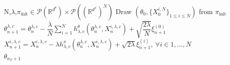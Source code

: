\documentclass[a4paper, 10pt]{article}
\theoremstyle{plain}%
\begin{document}
\begin{algorithm}
    \caption{Tamed interacting  particle Langevin algorithm - coordinate-wise (tIPLAc)}\label{algo2}
    \begin{algorithmic}
        \Require N,$\lambda$,$\pi_{\text{init}}\in\mathcal{P}(\mathbb{R}^{d^{\theta}})\times\mathcal{P}((\mathbb{R}^{d^x})^N)$
        \State Draw $(\theta_0,\{X_0^{i,N}\}_{1\leq i\leq N})$ from $\pi_{\text{init}}$
            \State $\theta_{n+1}^{\lambda,c}=\theta_{n}^{\lambda,c}-\dfrac{\lambda}{N}\sum_{i=1}^N h^{\theta}_{\lambda,c}(\theta_{n}^{\lambda,c},X_{n}^{i,\lambda,c})+\sqrt{\dfrac{2\lambda}{N}}\xi^{(0)}_{n+1}$\\
            \State $X_{n+1}^{i,\lambda,c}=X_{n}^{i,\lambda,c}-\lambda h^{x}_{\lambda,c}(\theta_{n}^{\lambda,c},X_{n}^{i,\lambda,c})+\sqrt{2\lambda}\xi^{(i)}_{n+1},\ \forall i\in{1,...,N}$
        \EndFor\\
        \Return $\theta_{n_T+1}$
    \end{algorithmic}
\end{algorithm}
\end{document}

